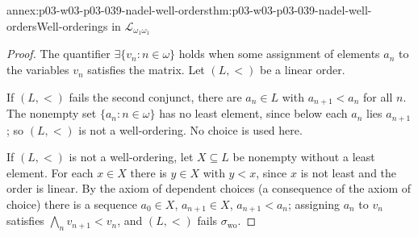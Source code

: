 \begin{annexitem}{annex:p03-w03-p03-039-nadel-well-orders}{thm:p03-w03-p03-039-nadel-well-orders}{Well-orderings in \(\mathscr L_{\omega_1\omega_1}\)}
\begin{proof}
The quantifier \(\exists\{v_n:n\in\omega\}\) holds when some assignment of
elements \(a_n\) to the variables \(v_n\) satisfies the matrix. Let
\((L,<)\) be a linear order.

If \((L,<)\) fails the second conjunct, there are \(a_n\in L\) with
\(a_{n+1}<a_n\) for all \(n\). The nonempty set \(\{a_n:n\in\omega\}\) has no
least element, since below each \(a_n\) lies \(a_{n+1}\); so \((L,<)\) is not
a well-ordering. No choice is used here.

If \((L,<)\) is not a well-ordering, let \(X\subseteq L\) be nonempty without
a least element. For each \(x\in X\) there is \(y\in X\) with \(y<x\), since
\(x\) is not least and the order is linear. By the axiom of dependent choices
(a consequence of the axiom of choice) there is a sequence \(a_0\in X\),
\(a_{n+1}\in X\), \(a_{n+1}<a_n\); assigning \(a_n\) to \(v_n\) satisfies
\(\bigwedge_nv_{n+1}<v_n\), and \((L,<)\) fails \(\sigma_{\mathrm{wo}}\).
\end{proof}
\end{annexitem}

